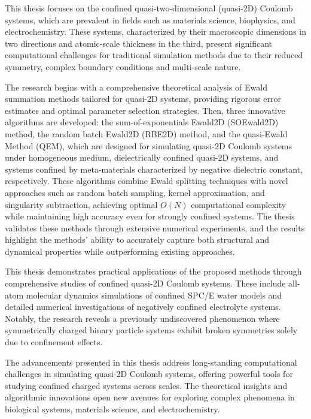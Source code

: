 This thesis focuses on the confined quasi-two-dimensional (quasi-2D) Coulomb systems, which are prevalent in fields such as materials science, biophysics, and electrochemistry. 
These systems, characterized by their macroscopic dimensions in two directions and atomic-scale thickness in the third, present significant computational challenges for traditional simulation methods due to their reduced symmetry, complex boundary conditions and multi-scale nature.

The research begins with a comprehensive theoretical analysis of Ewald summation methods tailored for quasi-2D systems, providing rigorous error estimates and optimal parameter selection strategies. 
Then, three innovative algorithms are developed: the sum-of-exponentials Ewald2D (SOEwald2D) method, the random batch Ewald2D (RBE2D) method, and the quasi-Ewald Method (QEM), which are designed for simulating quasi-2D Coulomb systems under homogeneous medium, dielectrically confined quasi-2D systems, and systems confined by meta-materials characterized by negative dielectric constant, respectively.
These algorithms combine Ewald splitting techniques with novel approaches such as random batch sampling, kernel approximation, and singularity subtraction, achieving optimal $O(N)$ computational complexity while maintaining high accuracy even for strongly confined systems.
The thesis validates these methods through extensive numerical experiments, and the results highlight the methods' ability to accurately capture both structural and dynamical properties while outperforming existing approaches.

This thesis demonstrates practical applications of the proposed methods through comprehensive studies of confined quasi-2D Coulomb systems. 
These include all-atom molecular dynamics simulations of confined SPC/E water models and detailed numerical investigations of negatively confined electrolyte systems. 
Notably, the research reveals a previously undiscovered phenomenon where symmetrically charged binary particle systems exhibit broken symmetries solely due to confinement effects.

The advancements presented in this thesis address long-standing computational challenges in simulating quasi-2D Coulomb systems, offering powerful tools for studying confined charged systems across scales. 
The theoretical insights and algorithmic innovations open new avenues for exploring complex phenomena in biological systems, materials science, and electrochemistry.
